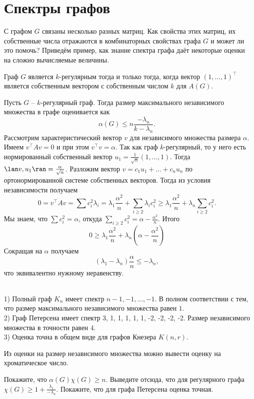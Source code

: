 \section{Спектры графов}
С графом $G$ связаны несколько разных матриц. Как свойства этих матриц, их собственные числа отражаются в комбинаторных свойствах графа $G$ и может ли это помочь?
Приведём пример, как знание спектра графа даёт некоторые оценки на сложно вычисляемые величины.

\rm Граф $G$ является $k$-регулярным тогда и только тогда, когда вектор $(1,\dots,1)^\top$ является собственным вектором с собственным числом $k$ для $A(G)$.
\erm

\thrm Пусть $G$ -- $k$-регулярный граф. Тогда размер максимального независимого множества в графе оценивается как
$$\alpha(G)\leq n\frac{-\lambda_n}{k-\lambda_n}.$$
\ethrm
\proof Рассмотрим характеристический вектор $v$ для независимого множества размера $\alpha$. Имеем $v^{\top}Av=0$ и при этом $v^{\top}v=\alpha$. Так как граф $k$-регулярный, то у него есть нормированный собственный вектор $u_1=\frac{1}{\sqrt{n}}(1,\dots,1)$. Тогда $\lan v,u_1\ran = \frac{\alpha}{\sqrt{n}}$. Разложим вектор $v=c_1u_1 + \dots + c_n u_n$ по ортонормированной системе собственных векторов. Тогда из условия независимости получаем
$$0=v^{\top}Av=\sum c_i^2 \lambda_i= \lambda_1\frac{\alpha^2}{n}+ \sum_{i\geq 2} \lambda_i c_i^2\geq \lambda_1\frac{\alpha^2}{n}+ \lambda_n \sum_{i\geq 2} c_i^2.$$
Мы знаем, что $\sum c_i^2=\alpha$, откуда $\sum_{i\geq 2} c_i^2=\alpha - \frac{\alpha^2}{n}$. Итого 
$$0\geq \lambda_1\frac{\alpha^2}{n}+\lambda_n(\alpha- \frac{\alpha^2}{n})$$
Сокращая на $\alpha$ получаем 
$$(\lambda_1-\lambda_n)\frac{\alpha}{n}\leq -\lambda_n,$$
что эквивалентно нужному неравенству.
\endproof




\exm\\
1) Полный граф $K_n$ имеет спектр $n-1,-1,\dots,-1$. В полном соответствии с тем, что размер максимального независимого множества равен $1$.\\
2) Граф Петерсена имеет спектр 3, 1, 1, 1, 1, 1, -2, -2, -2, -2. Размер независимого множества в точности равен $4$.\\
3) Оценка точна в общем виде для графов Кнезера $K(n,r)$.


Из оценки на размер независимого множества можно вывести оценку на хроматическое число.

\zd Покажите, что $\alpha(G) \chi(G) \geq n$. Выведите отсюда, что для регулярного графа $\chi(G)\geq 1+ \frac{\lambda_1}{-\lambda_n}$. Покажите, что для графа Петерсена оценка точная.
\ezd

